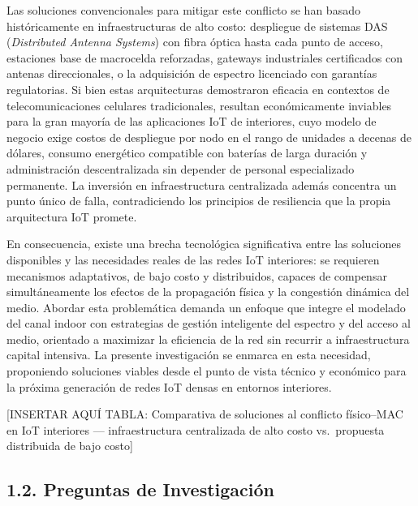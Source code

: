 \documentclass[
  12pt,
]{article}
\begin{document}
Las soluciones convencionales para mitigar este conflicto se han basado
históricamente en infraestructuras de alto costo: despliegue de sistemas
DAS (\emph{Distributed Antenna Systems}) con fibra óptica hasta cada
punto de acceso, estaciones base de macrocelda reforzadas, gateways
industriales certificados con antenas direccionales, o la adquisición de
espectro licenciado con garantías regulatorias. Si bien estas
arquitecturas demostraron eficacia en contextos de telecomunicaciones
celulares tradicionales, resultan económicamente inviables para la gran
mayoría de las aplicaciones IoT de interiores, cuyo modelo de negocio
exige costos de despliegue por nodo en el rango de unidades a decenas de
dólares, consumo energético compatible con baterías de larga duración y
administración descentralizada sin depender de personal especializado
permanente. La inversión en infraestructura centralizada además
concentra un punto único de falla, contradiciendo los principios de
resiliencia que la propia arquitectura IoT promete.

En consecuencia, existe una brecha tecnológica significativa entre las
soluciones disponibles y las necesidades reales de las redes IoT
interiores: se requieren mecanismos adaptativos, de bajo costo y
distribuidos, capaces de compensar simultáneamente los efectos de la
propagación física y la congestión dinámica del medio. Abordar esta
problemática demanda un enfoque que integre el modelado del canal indoor
con estrategias de gestión inteligente del espectro y del acceso al
medio, orientado a maximizar la eficiencia de la red sin recurrir a
infraestructura capital intensiva. La presente investigación se enmarca
en esta necesidad, proponiendo soluciones viables desde el punto de
vista técnico y económico para la próxima generación de redes IoT densas
en entornos interiores.

{[}INSERTAR AQUÍ TABLA: Comparativa de soluciones al conflicto
físico–MAC en IoT interiores — infraestructura centralizada de alto
costo vs.~propuesta distribuida de bajo costo{]}

\subsection{1.2. Preguntas de
Investigación}\label{preguntas-de-investigaciuxf3n}
\end{document}
